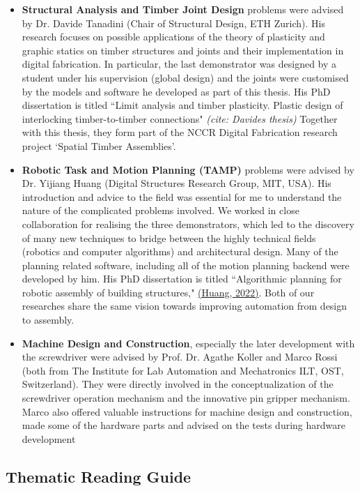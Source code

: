\documentclass[11pt]{book}
\begin{document}
\begin{itemize}
	\item \textbf{Structural Analysis and Timber Joint Design }problems were advised by Dr. Davide Tanadini (Chair of Structural Design, ETH Zurich). His research focuses on possible applications of the theory of plasticity and graphic statics on timber structures and joints and their implementation in digital fabrication. In particular, the last demonstrator was designed by a student under his supervision (global design) and the joints were customised by the models and software he developed as part of this thesis. His PhD dissertation is titled ``Limit analysis and timber plasticity. Plastic design of interlocking timber-to-timber connections" \textit{(cite: Davides thesis) }Together with this thesis, they form part of the NCCR Digital Fabrication research project ‘Spatial Timber Assemblies’.

	\item \textbf{Robotic Task and Motion Planning (TAMP) }problems were advised by Dr. Yijiang Huang (Digital Structures Research Group, MIT, USA). His introduction and advice to the field was essential for me to understand the nature of the complicated problems involved. We worked in close collaboration for realising the three demonstrators, which led to the discovery of many new techniques to bridge between the highly technical fields (robotics and computer algorithms) and architectural design. Many of the planning related software, including all of the motion planning backend were developed by him. His PhD dissertation is titled ``Algorithmic planning for robotic assembly of building structures," \href{https://www.zotero.org/google-docs/?GiBuSm}{(Huang, 2022)}. Both of our researches share the same vision towards improving automation from design to assembly. 

	\item \textbf{Machine Design and Construction}, especially the later development with the screwdriver were advised by Prof. Dr. Agathe Koller and Marco Rossi (both from The Institute for Lab Automation and Mechatronics ILT, OST, Switzerland). They were directly involved in the conceptualization of the screwdriver operation mechanism and the innovative pin gripper mechanism. Marco also offered valuable instructions for machine design and construction, made some of the hardware parts and advised on the tests during hardware development

\end{itemize}
\subsection{Thematic Reading Guide}
\end{document}
